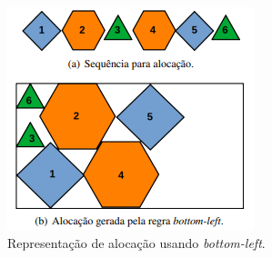 \begin{figure}[H]
    \centering
    \includegraphics{utils/images/bottom-left}
    \caption{Representação de alocação usando \textit{bottom-left}.}
    \label{fig:bottom-left}
\end{figure}
